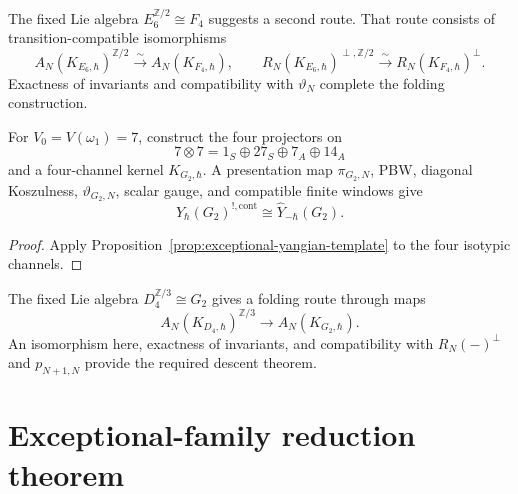 \begin{remark}[$F_4$ folding]
\label{rem:exceptional-yangian-F4-folding}
The fixed Lie algebra $E_6^{\mathbb Z/2}\cong F_4$ suggests a second
route.  That route consists of transition-compatible isomorphisms
\[
A_N(K_{E_6,\hbar})^{\mathbb Z/2}
\xrightarrow{\sim}A_N(K_{F_4,\hbar}),
\qquad
R_N(K_{E_6,\hbar})^{\perp,\mathbb Z/2}
\xrightarrow{\sim}R_N(K_{F_4,\hbar})^\perp.
\]
Exactness of invariants and compatibility with $\vartheta_N$ complete
the folding construction.
\end{remark}

\begin{proposition}
\label{prop:exceptional-yangian-koszul-G2}
For $V_0=V(\omega_1)=7$, construct the four projectors on
\[
7\otimes7=1_S\oplus27_S\oplus7_A\oplus14_A
\]
and a four-channel kernel $K_{G_2,\hbar}$.  A presentation map
$\pi_{G_2,N}$, PBW, diagonal Koszulness, $\vartheta_{G_2,N}$,
scalar gauge, and compatible finite windows give
\[
\widehat Y_\hbar(G_2)^{!,\mathrm{cont}}
\cong\widehat Y_{-\hbar}(G_2).
\]
\end{proposition}

\begin{proof}
Apply Proposition~\ref{prop:exceptional-yangian-template} to the four
isotypic channels.
\end{proof}

\begin{remark}[$G_2$ triality]
\label{rem:exceptional-yangian-G2-folding}
The fixed Lie algebra $D_4^{\mathbb Z/3}\cong G_2$ gives a folding route
through maps
\[
A_N(K_{D_4,\hbar})^{\mathbb Z/3}
\longrightarrow A_N(K_{G_2,\hbar}).
\]
An isomorphism here, exactness of invariants, and compatibility with
$R_N(-)^\perp$ and $p_{N+1,N}$ provide the required descent theorem.
\end{remark}

\section{Exceptional-family reduction theorem}
\label{sec:exceptional-yangian-five-family}

